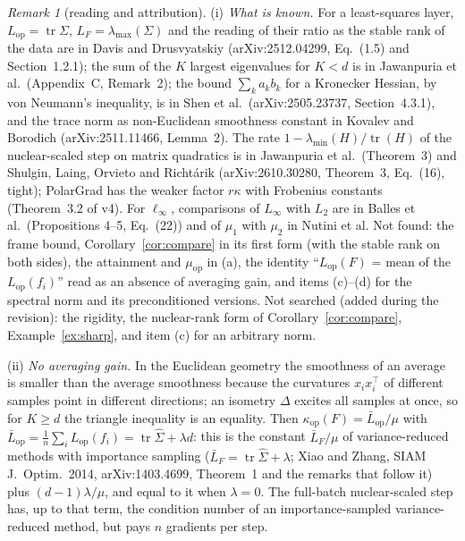 \documentclass[11pt]{article}
\theoremstyle{definition}
\theoremstyle{remark}
\newtheorem{remark}[theorem]{Remark}
\newcommand{\tr}{\operatorname{tr}}
\newcommand{\Lop}{L_{\mathrm{op}}}
\newcommand{\muop}{\mu_{\mathrm{op}}}
\newcommand{\kop}{\kappa_{\mathrm{op}}}
\newcommand{\lmin}{\lambda_{\min}}
\newcommand{\lmax}{\lambda_{\max}}
\begin{document}
\begin{remark}[reading and attribution]\label{rem:kappa}
(i) \emph{What is known.} For a least-squares layer, $\Lop=\tr\Sigma$, $L_F=\lmax(\Sigma)$ and the reading of their ratio
as the stable rank of the data are in Davis and Drusvyatskiy (arXiv:2512.04299, Eq.~(1.5) and Section~1.2.1); the sum of
the $K$ largest eigenvalues for $K<d$ is in Jawanpuria et al.\ (Appendix~C, Remark~2); the bound $\sum_ka_kb_k$ for a
Kronecker Hessian, by von Neumann's inequality, is in Shen et al.\ (arXiv:2505.23737, Section~4.3.1), and the trace norm
as non-Euclidean smoothness constant in Kovalev and Borodich (arXiv:2511.11466, Lemma~2). The rate
$1-\lmin(H)/\tr(H)$ of the nuclear-scaled step on matrix quadratics is in Jawanpuria et al.\ (Theorem~3) and Shulgin,
Laing, Orvieto and Richt\'arik (arXiv:2610.30280, Theorem~3, Eq.~(16), tight); PolarGrad has the weaker factor $r\kappa$
with Frobenius constants (Theorem~3.2 of v4). For $\ell_\infty$, comparisons of $L_\infty$ with $L_2$ are in Balles et
al.\ (Propositions 4--5, Eq.~(22)) and of $\mu_1$ with $\mu_2$ in Nutini et al. Not found: the frame bound,
Corollary~\ref{cor:compare} in its first form (with the stable rank on both sides), the attainment and $\muop$ in (a),
the identity ``$\Lop(F)$ = mean of the $\Lop(f_i)$'' read as an absence of averaging gain, and items (c)--(d) for the
spectral norm and its preconditioned versions. Not searched (added during the revision): the rigidity, the nuclear-rank
form of Corollary~\ref{cor:compare}, Example~\ref{ex:sharp}, and item (c) for an arbitrary norm.

(ii) \emph{No averaging gain.} In the Euclidean geometry the smoothness of an average is smaller than the average
smoothness because the curvatures $x_ix_i^\top$ of different samples point in different directions; an isometry
$\Delta$ excites all samples at once, so for $K\ge d$ the triangle inequality is an equality. Then
$\kop(F)=\bar L_{\mathrm{op}}/\mu$ with $\bar L_{\mathrm{op}}=\frac1n\sum_i\Lop(f_i)=\tr\hat\Sigma+\lambda d$: this is the
constant $\bar L_F/\mu$ of variance-reduced methods with importance sampling ($\bar L_F=\tr\hat\Sigma+\lambda$; Xiao and
Zhang, SIAM J.\ Optim.\ 2014, arXiv:1403.4699, Theorem~1 and the remarks that follow it) plus
$(d-1)\lambda/\mu$, and equal to it when $\lambda=0$. The full-batch nuclear-scaled step has, up to that term, the
condition number of an importance-sampled variance-reduced method, but pays $n$ gradients per step.


\end{remark}
\end{document}
